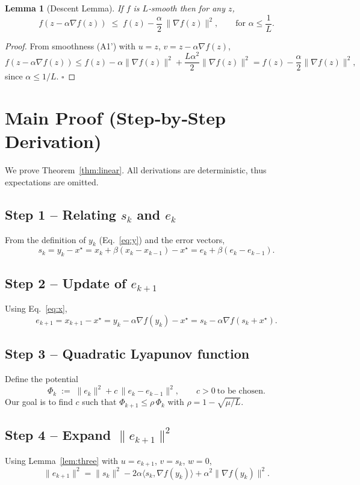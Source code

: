 \documentclass{article}
\newtheorem{lemma}{Lemma}
\begin{document}
\begin{lemma}[Descent Lemma]\label{lem:descent}
If $f$ is $L$‑smooth then for any $z$,
\[
f(z-\alpha\nabla f(z))\;\le\;f(z)-\frac{\alpha}{2}\,\|\nabla f(z)\|^{2},
\qquad\text{for }\alpha\le\frac{1}{L}.
\tag{L2}
\]
\end{lemma}
\begin{proof}
From smoothness (A1') with $u=z$, $v=z-\alpha\nabla f(z)$,
\[
f(z-\alpha\nabla f(z))\le f(z)-\alpha\|\nabla f(z)\|^{2}
+\frac{L\alpha^{2}}{2}\|\nabla f(z)\|^{2}
= f(z)-\frac{\alpha}{2}\|\nabla f(z)\|^{2},
\]
since $\alpha\le1/L$. \hfill $\square$
\end{proof}

\section*{Main Proof (Step‑by‑Step Derivation)}
We prove Theorem~\ref{thm:linear}.  
All derivations are deterministic, thus expectations are omitted.

\subsection*{Step 1 – Relating $s_{k}$ and $e_{k}$}
From the definition of $y_{k}$ (Eq.~\eqref{eq:y}) and the error vectors,
\[
s_{k}=y_{k}-x^{\star}=x_{k}+ \beta(x_{k}-x_{k-1})-x^{\star}
= e_{k}+ \beta(e_{k}-e_{k-1}). \tag{S1}
\]

\subsection*{Step 2 – Update of $e_{k+1}$}
Using Eq.~\eqref{eq:x},
\[
e_{k+1}=x_{k+1}-x^{\star}=y_{k}-\alpha\nabla f(y_{k})-x^{\star}
= s_{k}-\alpha\nabla f(s_{k}+x^{\star}). \tag{S2}
\]

\subsection*{Step 3 – Quadratic Lyapunov function}
Define the potential
\[
\Phi_{k}\;:=\;\|e_{k}\|^{2}+c\,\|e_{k}-e_{k-1}\|^{2},
\qquad c>0\ \text{to be chosen}. \tag{S3}
\]
Our goal is to find $c$ such that $\Phi_{k+1}\leq\rho\,\Phi_{k}$ with $\rho=1-\sqrt{\mu/L}$.

\subsection*{Step 4 – Expand $\|e_{k+1}\|^{2}$}
Using Lemma~\ref{lem:three} with $u=e_{k+1}$, $v=s_{k}$, $w=0$,
\[
\|e_{k+1}\|^{2}= \|s_{k}\|^{2}
-2\alpha\langle s_{k},\nabla f(y_{k})\rangle
+\alpha^{2}\|\nabla f(y_{k})\|^{2}. \tag{S4}
\]
\end{document}
